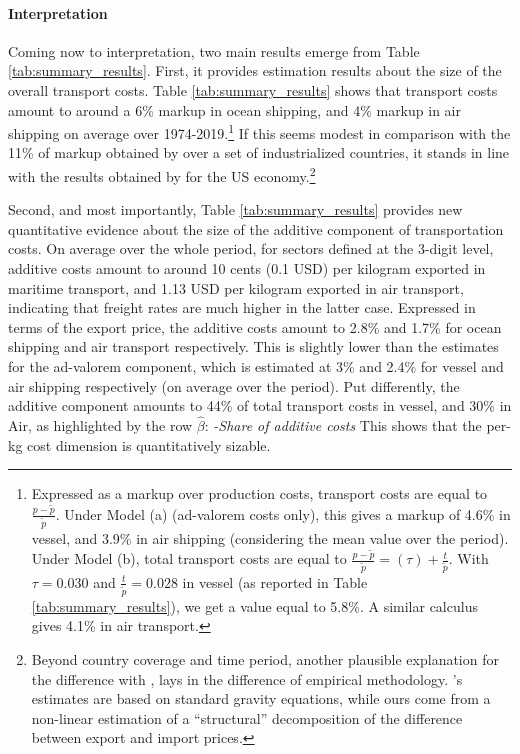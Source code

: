 \documentclass[a4paper,11pt]{article}
\begin{document}



\paragraph{Interpretation} Coming now to interpretation, two main results emerge from Table \ref{tab:summary_results}.
First, it provides estimation results about the size of the overall transport costs.
Table \ref{tab:summary_results} shows that transport costs amount to around a 6\% markup in ocean shipping, and 4\% markup in air shipping on average over 1974-2019.\footnote{Expressed as a markup over production costs, transport costs are equal to $\frac{p-\widetilde{p}}{\widetilde{p}}$.
Under Model (a) (ad-valorem costs only), this gives a markup of 4.6\% in vessel, and 3.9\% in air shipping (considering the mean value over the period).
Under Model (b), total transport costs are equal to $\frac{p-\widetilde{p}}{\widetilde{p}} = (\tau) + \frac{t}{\widetilde{p}}$.
With $\tau= 0.030$ and $\frac{t}{\widetilde{p}}= 0.028$ in vessel (as reported in Table \ref{tab:summary_results}), we get a value equal to 5.8\%.
A similar calculus gives 4.1\% in air transport.} If this seems modest in comparison with the 11\% of markup obtained by \cite{anderson_wincoop_jel} over a set of industrialized countries, it stands in line with the results obtained by \cite{hummels2007} for the US economy.\footnote{Beyond country coverage and time period, another plausible explanation for the difference with \cite{anderson_wincoop_jel}, lays in the difference of empirical methodology.
\cite{anderson_wincoop_jel}'s estimates are based on standard gravity equations, while ours come from a non-linear estimation of a ``structural'' decomposition of the difference between export and import prices.}

Second, and most importantly, Table \ref{tab:summary_results} provides new quantitative evidence about the size of the additive component of transportation costs.
On average over the whole period, for sectors defined at the 3-digit level, additive costs amount to around 10 cents (0.1 USD) per kilogram exported in maritime transport, and 1.13 USD per kilogram exported in air transport, indicating that freight rates are much higher in the latter case.
Expressed in terms of the export price, the additive costs amount to 2.8\% and 1.7\% for ocean shipping and air transport respectively.
This is slightly lower than the estimates for the ad-valorem component, which is estimated at 3\% and 2.4\% for vessel and air shipping respectively (on average over the period).
Put differently, the additive component amounts to 44\% of total transport costs in vessel, and 30\% in Air, as highlighted by the row $\widehat{\beta}$:  \textit{-Share of additive costs}
This shows that the per-kg cost dimension is quantitatively sizable.
\medskip
\end{document}
